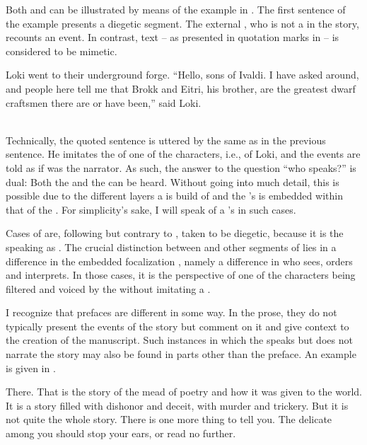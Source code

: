\documentclass[output=paper,colorlinks,citecolor=brown]{langscibook}
\begin{document}
Both  and  can be illustrated by means of the example in . The first sentence of the example presents a diegetic segment. The external , who is not a  in the story, recounts an event. In contrast,  text -- as presented in quotation marks in  -- is considered to be mimetic. 

\ea\label{ex:embNF}

Loki went to their underground forge. ``Hello, sons of Ivaldi. I have asked around, and people here tell me that Brokk and Eitri, his brother, are the greatest dwarf craftsmen there are or have been,'' said Loki.\\ \hfill \citep[54]{Gaiman2017}\\
\z

\noindent Technically, the quoted sentence is uttered by the same  as in the previous sentence. He imitates the  of one of the characters, i.e., of Loki, and the events are told as if was the narrator. As such, the answer to the question “who speaks?” is dual: Both the  and the  can be heard. Without going into much detail, this is possible due to the different layers a  is build of \citep{Bal1985} and the 's  is embedded within that of the . For simplicity's sake, I will speak of a 's  in such cases.

Cases of  are, following \citet{Jong2004} but contrary to \citet{Genette1972}, taken to be diegetic, because it is the  speaking as . The crucial distinction between  and other segments of  lies in a difference in the embedded focalization \citep[255]{Jong2004}, namely a difference in who sees, orders and interprets. In those cases, it is the perspective of one of the characters being filtered and voiced by the  without imitating a .

I recognize that prefaces are different in some way. In the  prose, they do not typically present the events of the story but comment on it and give context to the creation of the manuscript. Such instances in which the  speaks but does not narrate the story may also be found in parts other than the preface. An example is given in .

\ea \label{ex:edieg}
There. That is the story of the mead of poetry and how it was given to the world. It is a story filled with dishonor and deceit, with murder and trickery. But it is not quite the whole story. There is one more thing to tell you. The delicate among you should stop your ears, or read no further.\\ \hfill \citep[151]{Gaiman2017}
\z
\end{document}
